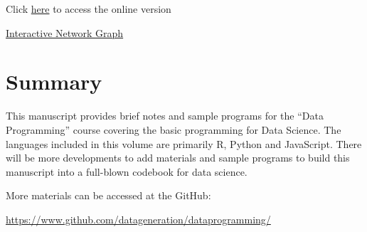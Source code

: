 \documentclass[]{book}
\begin{document}
Click \href{https://www.utdallas.edu/~kyho/present/aster/lpm.html}{here} to access the online version

\href{https://karl-ho.github.io/D3/createnetwork/index.html}{Interactive Network Graph}

\hypertarget{summary}{%
\chapter{Summary}\label{summary}}

This manuscript provides brief notes and sample programs for the ``Data Programming'' course covering the basic programming for Data Science. The languages included in this volume are primarily R, Python and JavaScript. There will be more developments to add materials and sample programs to build this manuscript into a full-blown codebook for data science.

More materials can be accessed at the GitHub:

\url{https://www.github.com/datageneration/dataprogramming/}


\end{document}
